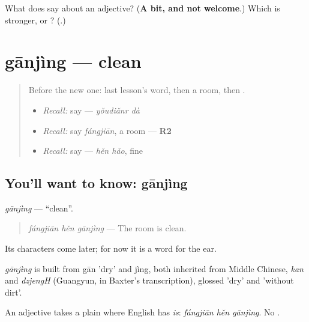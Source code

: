 \begin{tcolorbox}[breakable,colback=teal!4,colframe=teal!35!black,title={Before you move on}]
What does  say about an adjective? (\textbf{A bit, and not welcome}.) Which is stronger,  or ? (\textbf{}.)
\end{tcolorbox}
\section[gānjìng]{gānjìng — clean}

\label{lesson:ZH-C93-ganjing}



\begin{quote}
Before the new one: last lesson's word, then a room, then .

\begin{itemize}
\raggedright
  \item \emph{Recall:} say  — \emph{yǒudiǎnr dà}
  \item \emph{Recall:} say \emph{fángjiān}, a room — \textbf{R2}
  \item \emph{Recall:} say  — \emph{hěn hǎo}, fine
\end{itemize}
\end{quote}

\subsection*{You'll want to know: gānjìng}
\emph{gānjìng} — \textquotedblleft{}clean\textquotedblright{}.

\begin{quote}
\emph{fángjiān hěn gānjìng} — The room is clean.
\end{quote}

Its characters come later; for now it is a word for the ear.

\begin{cousinweb}
\emph{gānjìng} is built from gān 'dry' and jìng, both inherited from Middle Chinese, \emph{kan} and \emph{dzjengH} (Guangyun, in Baxter's transcription), glossed 'dry' and 'without dirt'.
\end{cousinweb}

\begin{grammarlens}[title={What you've built}]
An adjective takes a plain  where English has \emph{is}: \emph{fángjiān hěn gānjìng}. No .
\end{grammarlens}

